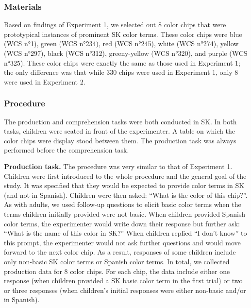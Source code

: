 \documentclass[floatsintext,man]{apa6}
\theoremstyle{definition}
\theoremstyle{definition}
\theoremstyle{definition}
\theoremstyle{remark}
\begin{document}
\subsubsection{Materials}\label{materials-1}

Based on findings of Experiment 1, we selected out 8 color chips that
were prototypical instances of prominent SK color terms. These color
chips were blue (WCS n°1), green (WCS n°234), red (WCS n°245), white
(WCS n°274), yellow (WCS n°297), black (WCS n°312), greeny-yellow (WCS
n°320), and purple (WCS n°325). These color chips were exactly the same
as those used in Experiment 1; the only difference was that while 330
chips were used in Experiment 1, only 8 were used in Experiment 2.

\subsubsection{Procedure}\label{procedure-1}

The production and comprehension tasks were both conducted in SK. In
both tasks, children were seated in front of the experimenter. A table
on which the color chips were display stood between them. The production
task was always performed before the comprehension task.

\textbf{Production task.} The procedure was very similar to that of
Experiment 1. Children were first introduced to the whole procedure and
the general goal of the study. It was specified that they would be
expected to provide color terms in SK (and not in Spanish). Children
were then asked: \enquote{What is the color of this chip?}. As with
adults, we used follow-up questions to elicit basic color terms when the
terms children initially provided were not basic. When children provided
Spanish color terms, the experimenter would write down their response
but further ask: \enquote{What is the name of this color in SK?} When
children replied \enquote{I don't know} to this prompt, the experimenter
would not ask further questions and would move forward to the next color
chip. As a result, responses of some children include only non-basic SK
color terms or Spanish color terms. In total, we collected production
data for 8 color chips. For each chip, the data include either one
response (when children provided a SK basic color term in the first
trial) or two or three responses (when children's initial responses were
either non-basic and/or in Spanish).
\end{document}
